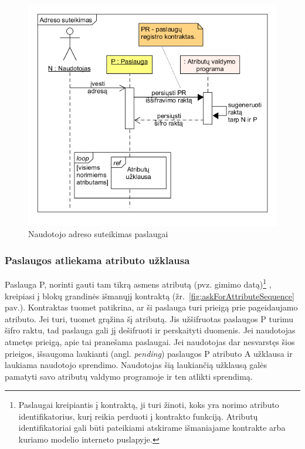 \begin{figure}[H]
    \centering
    \includegraphics[scale=0.6]{img/userGivesAddress}
    \caption{Naudotojo adreso suteikimas paslaugai}
    \label{fig:userGivesAddress}
\end{figure}

\subsubsection{Paslaugos atliekama atributo užklausa} \label{BCIDM:askForAttribute}

Paslauga P, norinti gauti tam tikrą asmens atributą (pvz. gimimo datą)\footnote{ Paslaugai kreipiantis į kontraktą, ji turi žinoti, koks yra norimo atributo identifikatorius, kurį reikia perduoti į kontrakto funkciją. 
Atributų identifikatoriai gali būti pateikiami atskirame išmaniajame kontrakte arba kuriamo modelio interneto puslapyje.}
, kreipiasi į blokų grandinės išmanųjį kontraktą (žr.\hypertarget{fig:askForAttributeSequence}{~\ref{fig:askForAttributeSequence} pav.}).
Kontraktas tuomet patikrina, ar ši paslauga turi prieigą prie pageidaujamo atributo. Jei turi, tuomet grąžina šį atributą. Jis
užšifruotas paslaugos P turimu šifro raktu, tad paslauga gali jį dešifruoti ir perskaityti duomenis. Jei
naudotojas atmetęs prieigą, apie tai pranešama paslaugai. Jei naudotojas dar nesvarstęs šios prieigos, išsaugoma laukianti
(angl. \textit{pending}) paslaugos P atributo A užklausa ir laukiama naudotojo sprendimo. Naudotojas šią laukiančią užklausą galės pamatyti savo 
atributų valdymo programoje ir ten atlikti sprendimą.


